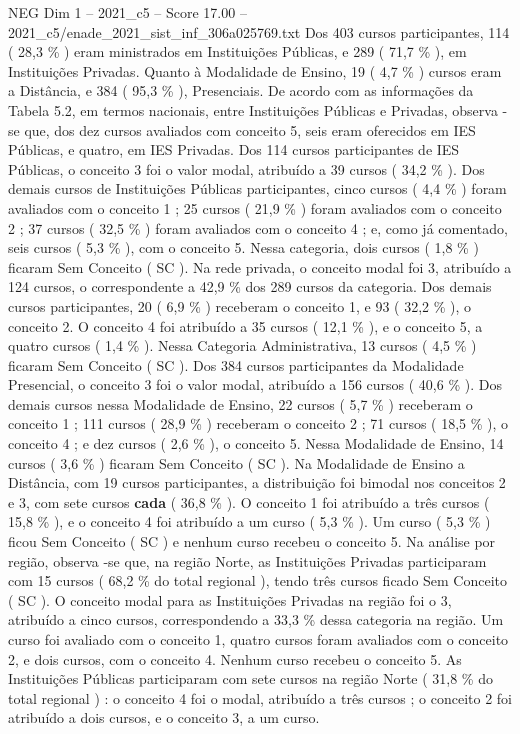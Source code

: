 \begin{textsample}{NEG Dim 1 – 2021\_c5 – Score 17.00 – 2021\_c5/enade\_2021\_sist\_inf\_306a025769.txt}
Dos 403 cursos participantes, 114 ( 28,3 \% ) eram ministrados em Instituições Públicas, e 289 ( 71,7 \% ), em Instituições Privadas.
Quanto à Modalidade de Ensino, 19 ( 4,7 \% ) cursos eram a Distância, e 384 ( 95,3 \% ), Presenciais.
De acordo com as informações da Tabela 5.2, em termos nacionais, entre Instituições Públicas e Privadas, observa -se que, dos dez cursos avaliados com conceito 5, seis eram oferecidos em IES Públicas, e quatro, em IES Privadas.
Dos 114 cursos participantes de IES Públicas, o conceito 3 foi o valor modal, atribuído a 39 cursos ( 34,2 \% ).
Dos demais cursos de Instituições Públicas participantes, cinco cursos ( 4,4 \% ) foram avaliados com o conceito 1 ; 25 cursos ( 21,9 \% ) foram avaliados com o conceito 2 ; 37 cursos ( 32,5 \% ) foram avaliados com o conceito 4 ; e, como já comentado, seis cursos ( 5,3 \% ), com o conceito 5.
Nessa categoria, dois cursos ( 1,8 \% ) ficaram Sem Conceito ( SC ).
Na rede privada, o conceito modal foi 3, atribuído a 124 cursos, o correspondente a 42,9 \% dos 289 cursos da categoria.
Dos demais cursos participantes, 20 ( 6,9 \% ) receberam o conceito 1, e 93 ( 32,2 \% ), o conceito 2.
O conceito 4 foi atribuído a 35 cursos ( 12,1 \% ), e o conceito 5, a quatro cursos ( 1,4 \% ).
Nessa Categoria Administrativa, 13 cursos ( 4,5 \% ) ficaram Sem Conceito ( SC ).
Dos 384 cursos participantes da Modalidade Presencial, o conceito 3 foi o valor modal, atribuído a 156 cursos ( 40,6 \% ).
Dos demais cursos nessa Modalidade de Ensino, 22 cursos ( 5,7 \% ) receberam o conceito 1 ; 111 cursos ( 28,9 \% ) receberam o conceito 2 ; 71 cursos ( 18,5 \% ), o conceito 4 ; e dez cursos ( 2,6 \% ), o conceito 5.
Nessa Modalidade de Ensino, 14 cursos ( 3,6 \% ) ficaram Sem Conceito ( SC ).
Na Modalidade de Ensino a Distância, com 19 cursos participantes, a distribuição foi bimodal nos conceitos 2 e 3, com sete cursos \textbf{cada} ( 36,8 \% ).
O conceito 1 foi atribuído a três cursos ( 15,8 \% ), e o conceito 4 foi atribuído a um curso ( 5,3 \% ).
Um curso ( 5,3 \% ) ficou Sem Conceito ( SC ) e nenhum curso recebeu o conceito 5.
Na análise por região, observa -se que, na região Norte, as Instituições Privadas participaram com 15 cursos ( 68,2 \% do total regional ), tendo três cursos ficado Sem Conceito ( SC ).
O conceito modal para as Instituições Privadas na região foi o 3, atribuído a cinco cursos, correspondendo a 33,3 \% dessa categoria na região.
Um curso foi avaliado com o conceito 1, quatro cursos foram avaliados com o conceito 2, e dois cursos, com o conceito 4.
Nenhum curso recebeu o conceito 5.
As Instituições Públicas participaram com sete cursos na região Norte ( 31,8 \% do total regional ) : o conceito 4 foi o modal, atribuído a três cursos ; o conceito 2 foi atribuído a dois cursos, e o conceito 3, a um curso.

\end{textsample}
